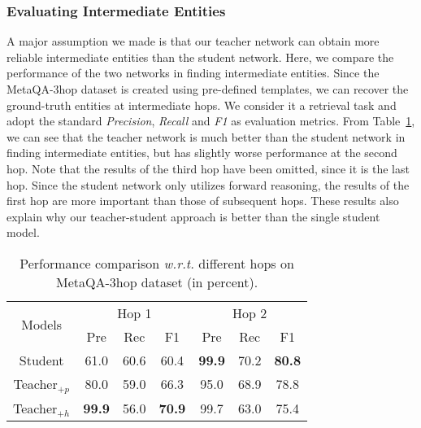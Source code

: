 \subsubsection{Evaluating Intermediate Entities}
A major assumption we made is that our teacher network can obtain more reliable intermediate entities than the student network. 
Here, we compare the performance of the two networks in finding intermediate entities. Since the MetaQA-3hop dataset is created using pre-defined templates, we can recover the ground-truth entities at intermediate hops. We consider it a retrieval task and adopt the standard \emph{Precision}, \emph{Recall} and \emph{F1} as evaluation metrics.  
From Table~\ref{tab:acc-int}, we can see that the teacher network is much better than the student network in finding intermediate entities, but has slightly worse performance at the second hop. 
Note that the results of the third hop have been omitted, since it is the last hop. 
Since the student network only utilizes forward reasoning, the results of the first hop are more important than those of subsequent hops. These results also explain why our teacher-student approach is better than the single student model. 

\begin{table}[htbp]
	\centering
	\caption{Performance comparison \emph{w.r.t.} different hops on MetaQA-3hop dataset (in percent).}
	\label{tab:acc-int}\begin{tabular}{c c c c| c c c}
\hline
			\multirow{2}{*}{Models}&\multicolumn{3}{c}{Hop 1}&\multicolumn{3}{c}{Hop 2}\\
			\cline{2-7}
			& Pre& Rec& F1& Pre& Rec& F1\\
			\hline
			Student&	61.0& 60.6& 60.4& \textbf{99.9}& 70.2& \textbf{80.8}\\
Teacher$_{+p}$&	80.0& 59.0& 66.3& 95.0& 68.9& 78.8\\
			Teacher$_{+h}$&	\textbf{99.9}& 56.0& \textbf{70.9}& 99.7& 63.0& 75.4\\
			\hline
		\end{tabular}\end{table}



